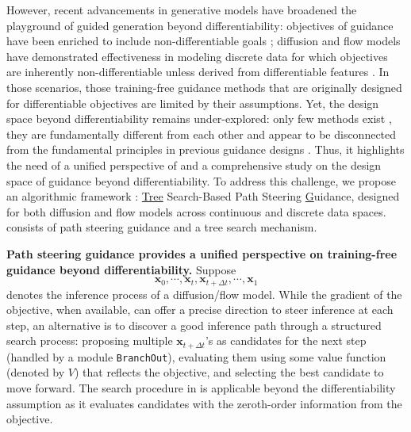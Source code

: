 However, recent advancements in generative models have broadened the playground of guided generation beyond differentiability: objectives of guidance have been enriched to include non-differentiable goals \citep{huang2024symbolic, ajay2022conditional}; diffusion and flow models have demonstrated effectiveness in modeling discrete data \citep{austin2021structured, vignac2022digress} for which objectives are inherently non-differentiable unless derived from differentiable features \citep{li2015improving, yap2011padel}. In those scenarios, those training-free guidance methods that are originally designed for differentiable objectives are limited by their assumptions. Yet, the design space beyond differentiability remains under-explored: only few methods exist \citep{lin2025tfgflow, huang2024symbolic}, they are fundamentally different from each other and appear to be disconnected from the fundamental principles in previous guidance designs \citep{lin2025tfgflow, chung2022diffusion}. Thus, it highlights the need of a unified perspective of and a comprehensive study on the design space of guidance beyond differentiability.
To address this challenge, we propose an algorithmic framework \textbf{\ouralg}: \underline{Tree} Search-Based Path Steering \underline{G}uidance, designed for both diffusion and flow models across continuous and discrete data spaces. \ouralg consists of path steering guidance and a tree search mechanism.









\textbf{Path steering guidance provides a unified perspective on training-free guidance beyond differentiability.} Suppose $$\boldsymbol{x}_0, \cdots, \boldsymbol{x}_t, \boldsymbol{x}_{t+\Delta t}, \cdots, \boldsymbol{x}_1$$ denotes the inference process of a diffusion/flow model. While the gradient of the objective, when available, can offer a precise direction to steer inference at each step, an alternative is to discover a good inference path through a structured search process: proposing multiple $\boldsymbol{x}_{t+\Delta t}$'s as candidates for the next step (handled by a module \texttt{BranchOut}), evaluating them using some value function (denoted by $V$) that reflects the objective, and selecting the best candidate to move forward. The search procedure in \ouralg is applicable beyond the differentiability assumption as it evaluates candidates with the zeroth-order information from the objective. 



